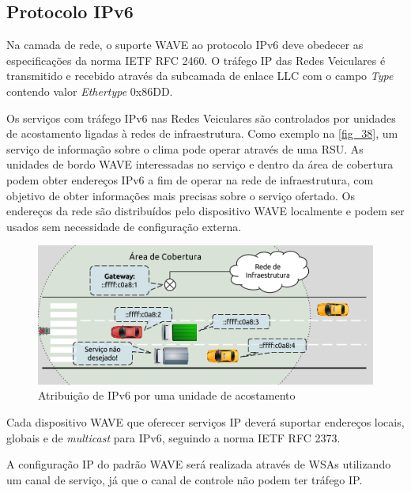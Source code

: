 \documentclass[
12pt,				%
openright,			%
oneside,			%
a4paper,			%
brazil,				%
]{abntex2}
\begin{document}
	\subsection{Protocolo IPv6}
	
	\par Na camada de rede, o suporte WAVE ao protocolo IPv6 deve obedecer as especificações da norma IETF RFC 2460. O tráfego IP das Redes Veiculares é transmitido e recebido através da subcamada de enlace LLC com o campo \textit{Type} contendo valor \textit{Ethertype} 0x86DD. 
	
	\par Os serviços com tráfego IPv6 nas Redes Veiculares são controlados por unidades de acostamento ligadas à redes de infraestrutura. Como exemplo na \autoref{fig_38}, um serviço de informação sobre o clima pode operar através de uma RSU. As unidades de bordo WAVE interessadas no serviço e dentro da área de cobertura podem obter endereços IPv6 a fim de operar na rede de infraestrutura, com objetivo de obter informações mais precisas sobre o serviço ofertado. Os endereços da rede são distribuídos pelo dispositivo WAVE localmente e podem ser usados sem necessidade de configuração externa.
	
	\begin{figure} [H]
		\centering
		\includegraphics[scale=.8]{figuras/cap3/38AtribuicaoIPv6RSU}
		\caption{\label{fig_38}Atribuição de IPv6 por uma unidade de acostamento}
	\end{figure}
	
	\par Cada dispositivo WAVE que oferecer serviços IP deverá suportar endereços locais, globais e de \textit{multicast} para IPv6, seguindo a norma IETF RFC 2373. 
	
	\par A configuração IP do padrão WAVE será realizada através de WSAs utilizando um canal de serviço, já que o canal de controle não podem ter tráfego IP. 
		
\end{document}
